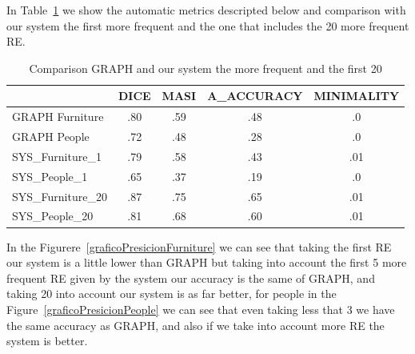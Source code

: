 In Table~\ref{Tabla_sis_1_20} we show the automatic metrics descripted below and comparison with our system the first more frequent and the one that includes the 20 more frequent RE.

\begin{table}[h!]
\begin{center}
\begin{tabular}{|l|c|c|c|c|}
\hline
	 	& 	DICE		&	MASI	&	A\_ACCURACY	&MINIMALITY	\\
\hline
GRAPH Furniture	& 	.80 		&	.59	&	.48		&	.0 	\\
GRAPH People 	& 	.72		&	.48	&	.28		&	.0	\\
\hline
SYS\_Furniture\_1	&	.79		&	.58	&	.43		&	.01	\\
SYS\_People\_1	&	.65		&	.37	&	.19		&	.0	\\
\hline
SYS\_Furniture\_20&	.87		&	.75  	&	.65		&	.01	\\
SYS\_People\_20	&	.81		&	.68	&	.60		&	.01	\\
\hline
\end{tabular}
\caption{Comparison GRAPH and our system the more frequent and the first 20}
\label{Tabla_sis_1_20}
\end{center}
\end{table}


In the Figurere~\ref{graficoPresicionFurniture} we can see that taking the first RE our system is a little lower than GRAPH but taking into account the first 5 more frequent RE given by the system our accuracy is the same of GRAPH, and taking 20 into account our system is as far better, for people in the Figure~\ref{graficoPresicionPeople} we can see that even taking less that 3 we have the same accuracy as GRAPH, and also if we take into account more RE the system is better.


